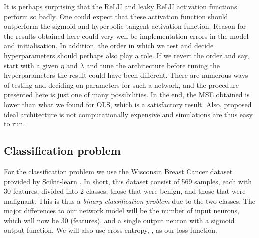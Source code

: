     It is perhaps surprising that the ReLU and leaky ReLU activation functions perform so badly. One could expect that these activation function should outperform the sigmoid and hyperbolic tangent activation function. Reason for the results obtained here could very well be implementation errors in the model and initialisation. In addition, the order in which we test and decide hyperparameters should perhaps also play a role. If we revert the order and say, start with a given $\eta$ and $\lambda$ and tune the architecture before tuning the hyperparameters the result could have been different. There are numerous ways of testing and deciding on parameters for such a network, and the procedure presented here is just one of many possibilities. In the end, the MSE obtained is lower than what we found for OLS, which is a satisfactory result. Also, proposed ideal architecture is not computationally expensive and simulations are thus easy to run. 

  






\subsection{Classification problem}\label{sec:analysis_classification}
    For the classification problem we use the Wisconsin Breast Cancer dataset provided by Scikit-learn \citep{scikit-learn}. In short, this dataset consist of 569 samples, each with 30 features, divided into 2 classes; those that were benign, and those that were malignant. This is thus a \textit{binary classification problem} due to the two classes. The major differences to our network model will be the number of input neurons, which will now be 30 (features), and a single output neuron with a sigmoid output function. We will also use cross entropy, , as our loss function. 
    
